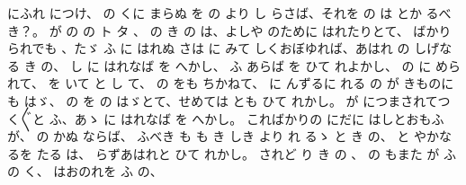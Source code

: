 にふれ
につけ、
の
くに
まらぬ
を
の
より
し
らさば、それを
の
は
とか
るべき？。
が
の
の
ト
タ
、
の
き
の
は、よしや
のために
はれたりとて、
ばかり
られでも
、たゞ
ふ
に
はれぬ
さは
に
みて
しくおぼゆれば、あはれ
の
しげなる
き
の、
し
に
はれなば
を
へかし、
ふ
あらば
を
ひて
れよかし、
の
に
められて、
を
いて
と
し
て、
の
をも
ちかねて、
に
んずるに
れる
の
が
きものにも
はゞ、
の
を
の
はゞとて、せめては
とも
ひて
れかし。
が
につまされてつく〴〵と
ふ、あゝ
に
はれなば
を
へかし。
こればかりの
にだに
はしとおもふが、
の
かぬ
ならば、
ふべき
も
も
き
しき
より
れ
るゝ
と
き
の、
と
やかなるを
たる
は、
らずあはれと
ひて
れかし。
されど
り
き
の
、
の
もまた
が
ふ
の
く、
はおのれを
ふ
の、
